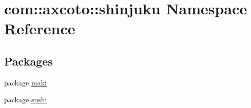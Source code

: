 \hypertarget{namespacecom_1_1axcoto_1_1shinjuku}{\section{com\-:\-:axcoto\-:\-:shinjuku \-Namespace \-Reference}
\label{namespacecom_1_1axcoto_1_1shinjuku}
}
\subsection*{\-Packages}
\begin{DoxyCompactItemize}
\item 
package \hyperlink{namespacecom_1_1axcoto_1_1shinjuku_1_1maki}{maki}
\item 
package \hyperlink{namespacecom_1_1axcoto_1_1shinjuku_1_1sushi}{sushi}
\end{DoxyCompactItemize}

